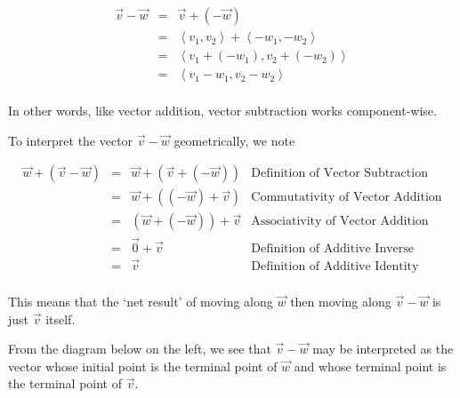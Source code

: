 \documentclass{ximera}
\begin{document}
\[\begin{array}{rcl} \overrightarrow{v} - \overrightarrow{w} & = & \overrightarrow{v} + (-\overrightarrow{w}) \\
&  = & \left<v_1,v_2\right> + \left<-w_1,-w_2\right> \\
& = &  \left<v_1 + \left(-w_1\right),v_2 + \left(-w_2\right) \right>\\
& = &  \left<v_1 -w_1,v_2 - w_2\right> \\ \end{array} \]

In other words, like vector addition, vector subtraction works component-wise.  

 

To interpret the vector $\overrightarrow{v} - \overrightarrow{w}$ geometrically, we note

\[ \begin{array}{rcll} \overrightarrow{w} + \left(\overrightarrow{v} - \overrightarrow{w}\right) & = & \overrightarrow{w} + \left(\overrightarrow{v} +(-\overrightarrow{w})\right) & \text{Definition of Vector Subtraction} \\
& = & \overrightarrow{w} + \left((-\overrightarrow{w})+\overrightarrow{v}\right) & \text{Commutativity of Vector Addition} \\
& = & (\overrightarrow{w} + (-\overrightarrow{w})) + \overrightarrow{v} & \text{Associativity of Vector Addition} \\
& = & \overrightarrow{0} + \overrightarrow{v} & \text{Definition of Additive Inverse}\\
& = & \overrightarrow{v} & \text{Definition of Additive Identity} \\ \end{array} \]

This means that the `net result' of moving along $\overrightarrow{w}$ then moving along  $\overrightarrow{v} - \overrightarrow{w}$ is just $\overrightarrow{v}$ itself.  

 

From the diagram below on the left, we see that  $\overrightarrow{v}-\overrightarrow{w}$ may be interpreted as the vector whose initial point is the terminal point of $\overrightarrow{w}$ and whose terminal point is the terminal point of $\overrightarrow{v}$.
\end{document}
